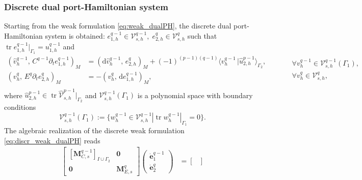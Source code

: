 \documentclass{elsarticle}
\renewcommand\d{\ensuremath{\mathrm{d}}}
\DeclareMathOperator{\tr}{tr}
\newcommand*{\dual}[1]{\ensuremath{\widehat{#1}}}
\newcommand{\inpr}[3][]{\ensuremath{( #2, \, #3 )_{#1}}}
\newcommand{\dualpr}[3][]{\ensuremath{\langle #2 \, \vert #3 \rangle_{#1}}}
\begin{document}
{\subsubsection{Discrete dual port-Hamiltonian system}
Starting from the weak formulation \eqref{eq:weak_dualPH}, the discrete dual port-Hamiltonian system is obtained: ${e}^{q-1}_{1, h} \in {\mathcal{V}}^{q-1}_{s, h}, \; {e}^{q}_{2, h} \in {\mathcal{V}}^{q}_{s, h}$ such that $\tr {e}^{q-1}_{1, h} \vert_{\Gamma_1} = {u}^{q-1}_{1, h}$ and
\begin{equation}\label{eq:discr_weak_dualPH}
	\begin{aligned}
    	\inpr[M]{\dual{v}^{q-1}_h}{{C}^{q-1} \partial_t e^{q-1}_{1, h}} &= \inpr[M]{\d\dual{v}^{q-1}_h}{{e}^q_{2, h}} + (-1)^{(p-1)(q-1)} \dualpr[\Gamma_2]{{v}^{q-1}_h}{\dual{u}_{2, h}^{p-1}}, \\
		\inpr[M]{v^{q}_h}{E^{q} \partial_t {e}^{q}_{2, h}} &= -\inpr[M]{v^q_h}{\d e^{q-1}_{1, h}}, \\
	\end{aligned} \qquad 
	\begin{aligned}
		&\forall v^{q-1}_h \in \mathcal{V}^{q-1}_{s, h}(\Gamma_1), \\
		&\forall {v}^q_h \in \mathcal{V}^{q}_{s, h}, \\
	\end{aligned}
\end{equation}
where $\dual{u}_{2, h}^{p-1} \in \tr \dual{\mathcal{V}}_{s, h}^{p-1}|_{\Gamma_2}$ and $\mathcal{V}_{s, h}^{q-1}(\Gamma_1)$ is a polynomial space with boundary conditions
\begin{equation}
    \mathcal{V}^{q-1}_{s, h}(\Gamma_1) := \{w^{q-1}_h \in \mathcal{V}^{q-1}_{s, h}| \tr w^{q-1}_h |_{\Gamma_1} = 0 \}.
\end{equation}
The algebraic realization of the discrete weak formulation \eqref{eq:discr_weak_dualPH} reads
\begin{equation}\label{eq:alg_dualPH}
\begin{aligned}
    \begin{bmatrix}
        [\mathbf{M}^{q-1}_{{C}, s}]_{I \cup \Gamma_2} & \mathbf{0} \\
        \mathbf{0} & \mathbf{M}^q_{E, s}
    \end{bmatrix}
    \begin{pmatrix}
    \dot{\mathbf{e}}_1^{q-1} \\
    \dot{{\mathbf{e}}}_2^q
    \end{pmatrix} &= 
    \begin{bmatrix}

\end{bmatrix}
\end{aligned}
\end{equation}}
\end{document}
